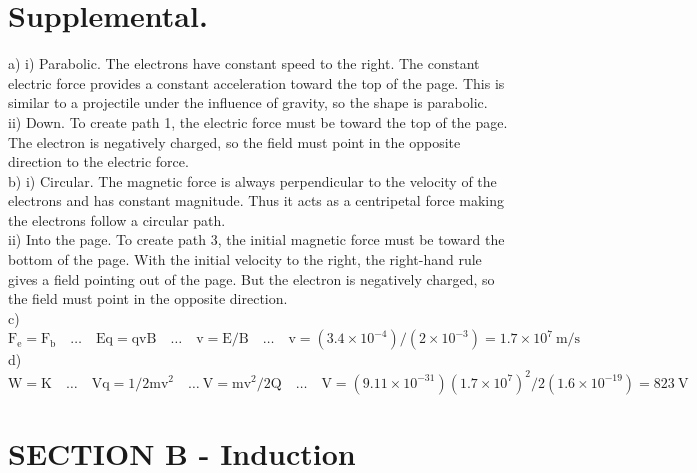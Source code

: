 \begin{enumerate}
\section*{Supplemental.}
a) i) Parabolic. The electrons have constant speed to the right. The constant electric force provides a constant acceleration toward the top of the page. This is similar to a projectile under the influence of gravity, so the shape is parabolic.\\
ii) Down. To create path 1, the electric force must be toward the top of the page. The electron is negatively charged, so the field must point in the opposite direction to the electric force.\\
b) i) Circular. The magnetic force is always perpendicular to the velocity of the electrons and has constant magnitude. Thus it acts as a centripetal force making the electrons follow a circular path.\\
ii) Into the page. To create path 3, the initial magnetic force must be toward the bottom of the page. With the initial velocity to the right, the right-hand rule gives a field pointing out of the page. But the electron is negatively charged, so the field must point in the opposite direction.\\
c) $\mathrm{F}_{\mathrm{e}}=\mathrm{F}_{\mathrm{b}} \quad \ldots \quad \mathrm{Eq}=\mathrm{qvB} \quad \ldots \quad \mathrm{v}=\mathrm{E} / \mathrm{B} \quad \ldots \quad \mathrm{v}=\left(3.4 \times 10^{-4}\right) /\left(2 \times 10^{-3}\right)=1.7 \times 10^{7} \mathrm{~m} / \mathrm{s}$\\
d) $\mathrm{W}=\mathrm{K} \quad \ldots \quad \mathrm{Vq}=1 / 2 \mathrm{mv}^{2} \quad \ldots \mathrm{~V}=\mathrm{mv}^{2} / 2 \mathrm{Q} \quad \ldots \quad \mathrm{V}=\left(9.11 \times 10^{-31}\right)\left(1.7 \times 10^{7}\right)^{2} / 2\left(1.6 \times 10^{-19}\right)=823 \mathrm{~V}$

\section*{SECTION B - Induction}

\end{enumerate}
